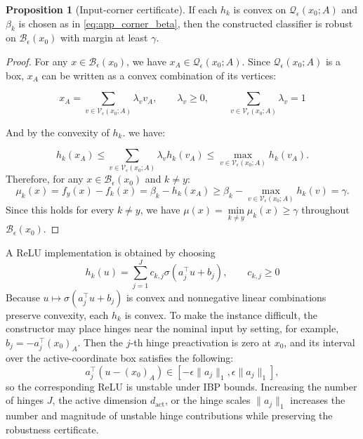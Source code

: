 \documentclass{article}
\theoremstyle{definition}
\newtheorem{proposition}[theorem]{Proposition}
\begin{document}
\begin{proposition}[Input-corner certificate]
If each $h_k$ is convex on $\mathcal Q_\epsilon(x_0;A)$ and $\beta_k$ is chosen as in \eqref{eq:app_corner_beta}, then the constructed classifier is robust on $\mathcal B_\epsilon(x_0)$ with margin at least $\gamma$.
\end{proposition}

\begin{proof}
For any $x\in\mathcal B_\epsilon(x_0)$, we have $x_A\in\mathcal Q_\epsilon(x_0;A)$. Since $\mathcal Q_\epsilon(x_0;A)$ is a box, $x_A$ can be written as a convex combination of its vertices:

\begin{equation}
    x_A = \sum_{v\in\mathcal V_\epsilon(x_0;A)} \lambda_v v_A,
    \qquad \lambda_v\geq 0,
    \qquad \sum_{v\in\mathcal V_\epsilon(x_0;A)} \lambda_v=1
\end{equation}

And by the convexity of $h_k$. we have:

\begin{equation}
h_k(x_A)\leq
    \sum_{v\in\mathcal V_\epsilon(x_0;A)} \lambda_v h_k(v_A) \leq
    \max_{v\in\mathcal V_\epsilon(x_0;A)} h_k(v_A).
    \label{eq:corner_convex_max}
\end{equation}
Therefore, for any $x\in\mathcal B_\epsilon(x_0)$ and $k\neq y$:
\begin{equation}
    \mu_k(x) =f_y(x)-f_k(x)=\beta_k-h_k(x_A)
    \geq
    \beta_k-\max_{v\in\mathcal V_\epsilon(x_0;A)}h_k(v)=\gamma.
    \label{eq:corner_margin}
\end{equation}
Since this holds for every $k\neq y$, we have $\mu(x)=\min\limits_{k\neq y}\mu_k(x)\geq\gamma$ throughout $\mathcal B_\epsilon(x_0)$.
\end{proof}

A ReLU implementation is obtained by choosing
\begin{equation}
    h_k(u)=\sum_{j=1}^{J} c_{k,j}\sigma(a_j^\top u+b_j),
    \qquad
    c_{k,j}\geq 0
    \label{eq:corner_relu_hinges}
\end{equation}
Because $u\mapsto\sigma(a_j^\top u+b_j)$ is convex and nonnegative linear combinations preserve convexity, each $h_k$ is convex. To make the instance difficult, the constructor may place hinges near the nominal input by setting, for example, $b_j=-a_j^\top (x_0)_A$. Then the $j$-th hinge preactivation is zero at $x_0$, and its interval over the active-coordinate box satisfies the following:
\begin{equation}
    a_j^\top(u-(x_0)_A)
    \in
    [-\epsilon\|a_j\|_1,\epsilon\|a_j\|_1],
    \label{eq:corner_hinge_interval}
\end{equation}
so the corresponding ReLU is unstable under IBP bounds. Increasing the number of hinges $J$, the active dimension $d_{\mathrm{act}}$, or the hinge scales $\|a_j\|_1$ increases the number and magnitude of unstable hinge contributions while preserving the robustness certificate.
\end{document}
